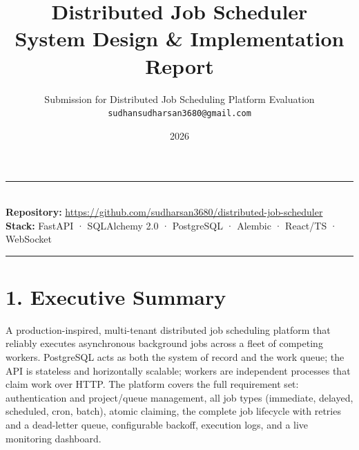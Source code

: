 \documentclass[11pt]{article}
\title{\textbf{Distributed Job Scheduler}\\[2pt]\Large System Design \& Implementation Report}
\author{Submission for Distributed Job Scheduling Platform Evaluation \\
\texttt{sudhansudharsan3680@gmail.com}}
\date{2026}
\begin{document}
\sloppy
\maketitle
\noindent\rule{\textwidth}{1.2pt}\\[-2pt]
\noindent\textbf{Repository:} \url{https://github.com/sudharsan3680/distributed-job-scheduler}
\qquad\textbf{Stack:} FastAPI · SQLAlchemy 2.0 · PostgreSQL · Alembic · React/TS · WebSocket
\\[-6pt]\noindent\rule{\textwidth}{1.2pt}

\section*{1. Executive Summary}
A production-inspired, multi-tenant distributed job scheduling platform that reliably executes
asynchronous background jobs across a fleet of competing workers. PostgreSQL acts as both the
system of record and the work queue; the API is stateless and horizontally scalable; workers are
independent processes that claim work over HTTP. The platform covers the full requirement set:
authentication and project/queue management, all job types (immediate, delayed, scheduled, cron,
batch), atomic claiming, the complete job lifecycle with retries and a dead-letter queue,
configurable backoff, execution logs, and a live monitoring dashboard.
\end{document}
